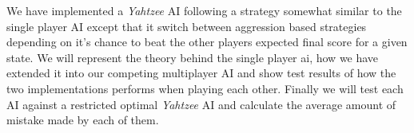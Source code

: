 We have implemented a \emph{Yahtzee} AI following a strategy somewhat similar to the single player AI except that it switch between aggression based strategies depending on it's chance to beat the other players expected final score for a given state. We will represent the theory behind the single player ai, how we have extended it into our competing multiplayer AI and show test results of how the two implementations performs when playing each other. Finally we will test each AI against a restricted optimal \emph{Yahtzee} AI and calculate the average amount of mistake made by each of them.

